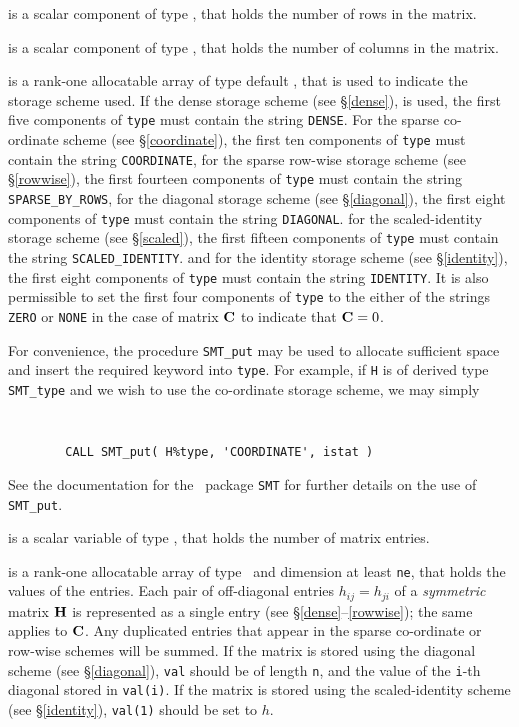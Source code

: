 \documentclass{galahad}
\begin{document}
\begin{description}

 is a scalar component of type \integer,
that holds the number of rows in the matrix.

 is a scalar component of type \integer,
that holds the number of columns in the matrix.

 is a rank-one allocatable array of type default \character, that
is used to indicate the storage scheme used. If the dense storage scheme
(see \S\ref{dense}), is used,
the first five components of {\tt type} must contain the
string {\tt DENSE}.
For the sparse co-ordinate scheme (see \S\ref{coordinate}),
the first ten components of {\tt type} must contain the
string {\tt COORDINATE},
for the sparse row-wise storage scheme (see \S\ref{rowwise}),
the first fourteen components of {\tt type} must contain the
string {\tt SPARSE\_BY\_ROWS},
for the diagonal storage scheme (see \S\ref{diagonal}),
the first eight components of {\tt type} must contain the
string {\tt DIAGONAL}.
for the scaled-identity storage scheme (see \S\ref{scaled}),
the first fifteen components of {\tt type} must contain the
string {\tt SCALED\_IDENTITY}.
and for the identity storage scheme (see \S\ref{identity}),
the first eight components of {\tt type} must contain the
string {\tt IDENTITY}.
It is also permissible to set
the first four components of {\tt type} to the either of the strings
{\tt ZERO} or {\tt NONE}
in the case of matrix ${\mathbf{C}}$ to indicate that ${\mathbf{C}} = 0$.

For convenience, the procedure {\tt SMT\_put}
may be used to allocate sufficient space and insert the required keyword
into {\tt type}.
For example, if {\tt H} is of derived type {\tt SMT\_type}
and we wish to use the co-ordinate storage scheme, we may simply
{\tt
\begin{verbatim}
        CALL SMT_put( H%type, 'COORDINATE', istat )
\end{verbatim}
}
\noindent
See the documentation for the \galahad\ package {\tt SMT}
for further details on the use of {\tt SMT\_put}.

 is a scalar variable of type \integer, that
holds the number of matrix entries.

 is a rank-one allocatable array of type \realdp\,
and dimension at least {\tt ne}, that holds the values of the entries.
Each pair of off-diagonal entries $h_{ij} = h_{ji}$ of a {\em symmetric}
matrix ${\mathbf{H}}$ is represented as a single entry
(see \S\ref{dense}--\ref{rowwise}); the same applies to ${\mathbf{C}}$.
Any duplicated entries that appear in the sparse
co-ordinate or row-wise schemes will be summed.
If the matrix is stored using the diagonal scheme (see \S\ref{diagonal}),
{\tt val} should be of length {\tt n}, and the value of the {\tt i}-th
diagonal stored in {\tt val(i)}.
If the matrix is stored using the scaled-identity scheme (see \S\ref{identity}),
{\tt val(1)} should be set to $h$.


\end{description}
\end{document}
